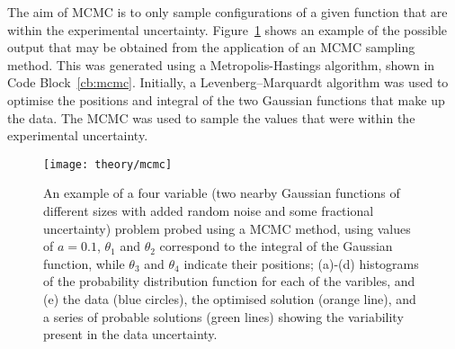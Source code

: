 The aim of MCMC is to only sample configurations of a given function that are within the experimental uncertainty.
Figure~\ref{fig:mcmc} shows an example of the possible output that may be obtained from the application of an MCMC sampling method.
This was generated using a Metropolis-Hastings algorithm,\autocite{metropolis_equation_1953,hastings_monte_1970} shown in Code Block~\ref{cb:mcmc}.
Initially, a Levenberg–Marquardt algorithm\autocite{levenberg_method_1944,marquardt_algorithm_1963} was used to optimise the positions and integral of the two Gaussian functions that make up the data.
The MCMC was used to sample the values that were within the experimental uncertainty.
%
\begin{figure}
    \centering
    \texttt{[image: theory/mcmc]}
    \caption{An example of a four variable (two nearby Gaussian functions of different sizes with added random noise and some fractional uncertainty) problem probed using a MCMC method, using values of $a=0.1$, $\theta_1$ and $\theta_2$ correspond to the integral of the Gaussian function, while $\theta_3$ and $\theta_4$ indicate their positions; (a)-(d) histograms of the probability distribution function for each of the varibles, and (e) the data (blue circles), the optimised solution (orange line), and a series of probable solutions (green lines) showing the variability present in the data uncertainty.}
    \label{fig:mcmc}
\end{figure}
%
\begin{figure}
    \centering
        
\end{figure}
%

